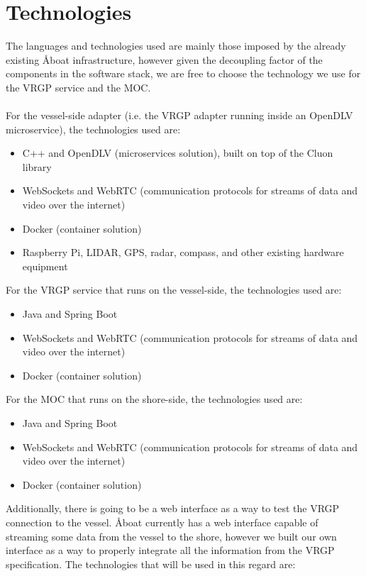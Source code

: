 \section{Technologies}\label{sec:technologies}

The languages and technologies used are mainly those imposed by the already existing Åboat infrastructure, however given the decoupling factor of the components in the software stack, we are free to choose the technology we use for the VRGP service and the MOC.
\\\\
For the vessel-side adapter (i.e. the VRGP adapter running inside an OpenDLV microservice), the technologies used are:

\begin{itemize}
	\item C++ and OpenDLV (microservices solution), built on top of the Cluon library
	\item WebSockets and WebRTC (communication protocols for streams of data and video over the internet)
	\item Docker (container solution)
	\item Raspberry Pi, LIDAR, GPS, radar, compass, and other existing hardware equipment
\end{itemize}

\noindent
For the VRGP service that runs on the vessel-side, the technologies used are:

\begin{itemize}
	\item Java and Spring Boot
	\item WebSockets and WebRTC (communication protocols for streams of data and video over the internet)
	\item Docker (container solution)
\end{itemize}

\noindent
For the MOC that runs on the shore-side, the technologies used are:

\begin{itemize}
	\item Java and Spring Boot
	\item WebSockets and WebRTC (communication protocols for streams of data and video over the internet)
	\item Docker (container solution)
\end{itemize}

\noindent
Additionally, there is going to be a web interface as a way to test the VRGP connection to the vessel. Åboat currently has a web interface capable of streaming some data from the vessel to the shore, however we built our own interface as a way to properly integrate all the information from the VRGP specification. The technologies that will be used in this regard are:

